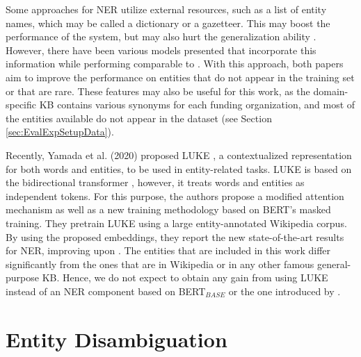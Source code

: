 \documentclass{report}
\theoremstyle{definition}
\theoremstyle{remark}
\begin{document}
Some approaches for NER utilize external resources, such as a list of entity names, which may be called a dictionary or a gazetteer. This may boost the performance of the system, but may also hurt the generalization ability \cite{NERsurvey}. However, there have been various models presented \cite{NERgazetteer, NERDict} that incorporate this information while performing comparable to \cite{flairpaper}. With this approach, both papers \cite{NERgazetteer, NERDict} aim to improve the performance on entities that do not appear in the training set or that are rare. These features may also be useful for this work, as the domain-specific KB contains various synonyms for each funding organization, and most of the entities available do not appear in the dataset (see Section \ref{sec:EvalExpSetupData}).

Recently, Yamada et al. (2020) proposed LUKE \cite{LUKE}, a contextualized representation for both words and entities, to be used in entity-related tasks. LUKE is based on the bidirectional transformer \cite{transformer}, however, it treats words and entities as independent tokens. For this purpose, the authors propose a modified attention mechanism as well as a new training methodology based on BERT's masked training. They pretrain LUKE using a large entity-annotated Wikipedia corpus. By using the proposed embeddings, they report the new state-of-the-art results for NER, improving upon \cite{flairpaper}. The entities that are included in this work differ significantly from the ones that are in Wikipedia or in any other famous general-purpose KB. Hence, we do not expect to obtain any gain from using LUKE instead of an NER component based on BERT$_{BASE}$ or the one introduced by \cite{flairpaper}.

\section{Entity Disambiguation}
\label{sota2}
\end{document}
